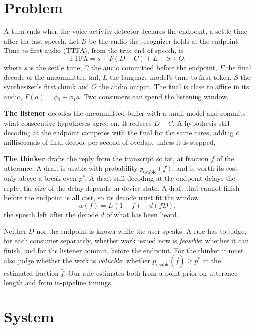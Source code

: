 \documentclass[a4paper,10pt,twocolumn]{article}
\begin{document}
\section{Problem}
\label{sec:problem}

A turn ends when the voice-activity detector declares the endpoint, a settle
time after the last speech. Let $D$ be the audio the recognizer holds at the
endpoint. Time to first audio (TTFA), from the true end of speech, is
\begin{equation}
\mathrm{TTFA} = s + F(D - C) + L + S + O,
\end{equation}
where $s$ is the settle time, $C$ the audio committed before the endpoint, $F$
the final decode of the uncommitted tail, $L$ the language model's time to
first token, $S$ the synthesizer's first chunk and $O$ the audio output. The
final is close to affine in its audio, $F(a) = \phi_0 + \phi_1 a$. Two
consumers can spend the listening window.

\textbf{The listener} decodes the uncommitted buffer with a small model and
commits what consecutive hypotheses agree on. It reduces $D - C$. A hypothesis
still decoding at the endpoint competes with the final for the same cores,
adding $c$ milliseconds of final decode per second of overlap, unless it is
stopped.

\textbf{The thinker} drafts the reply from the transcript so far, at fraction
$f$ of the utterance. A draft is usable with probability $p_{\mathrm{usable}}(f)$,
and is worth its cost only above a break-even $p^\ast$. A draft still decoding
at the endpoint delays the reply; the size of the delay depends on device
state. A draft that cannot finish before the endpoint is all cost, so its
decode must fit the window
\begin{equation}
w(f) = D(1-f) - d(fD),
\end{equation}
the speech left after the decode $d$ of what has been heard.

Neither $D$ nor the endpoint is known while the user speaks. A rule has to
judge, for each consumer separately, whether work issued now is
\emph{feasible}: whether it can finish, and for the listener commit, before
the endpoint. For the thinker it must also judge whether the work is
\emph{valuable}: whether $p_{\mathrm{usable}}(\hat f) \ge p^\ast$ at the
estimated fraction $\hat f$. Our rule estimates both from a point prior on
utterance length and from in-pipeline timings.

\section{System}
\label{sec:system}
\end{document}
